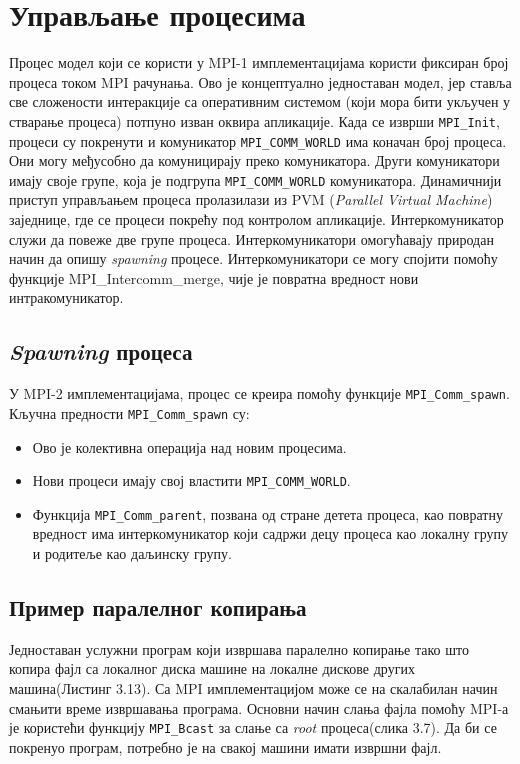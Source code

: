 \section{Управљање процесима}
Процес модел који се користи у MPI-1 имплементацијама користи фиксиран број процеса током MPI рачунања. Ово је концептуално једноставан модел, јер ставља све сложености интеракције са оперативним системом (који мора бити 
укључен у стварање процеса) потпуно изван оквира апликације. Када се изврши \texttt{MPI\_Init}, процеси су покренути и комуникатор \texttt{MPI\_COMM\_WORLD} има коначан број процеса. Они могу међусобно да комуницирају преко комуникатора. Други комуникатори имају своје групе, која је подгрупа \texttt{MPI\_COMM\_WORLD} комуникатора. Динамичнији приступ управљањем процеса пролазилази из \gls{PVM} (\textit{Parallel Virtual Machine}) заједнице, где се процеси покрећу под контролом апликације. Интеркомуникатор служи да повеже две групе процеса. Интеркомуникатори омогућавају природан начин да опишу \textit{spawning} процесе. Интеркомуникатори се могу спојити помоћу функције MPI\_Intercomm\_merge, чије је повратна вредност нови интракомуникатор.

\subsection{\textit{Spawning} процеса}
У MPI-2 имплементацијама, процес се креира помоћу функције \texttt{MPI\_Comm\_spawn}. Кључна предности \texttt{MPI\_Comm\_spawn} су:

\begin{itemize}
	\item Ово је колективна операција над новим процесима.
	\item Нови процеси имају свој властити \texttt{MPI\_COMM\_WORLD}.
	\item Функција \texttt{MPI\_Comm\_parent}, позвана од стране детета процеса, као повратну вредност има интеркомуникатор који садржи децу процеса као локалну групу и родитеље као даљинску групу.
\end{itemize}

\subsection{Пример паралелног копирања}

Једноставан услужни програм који извршава паралелно копирање тако што копира фајл са локалног диска машине на локалне дискове других машина(Листинг 3.13). Са MPI имплементацијом може се на скалабилан начин смањити време извршавања програма. Основни начин слања фајла помоћу MPI-а је користећи функцију  \texttt{MPI\_Bcast} за слање са \textit{root} процеса(слика 3.7). Да би се покренуо програм, потребно је на свакој машини имати извршни фајл. 


